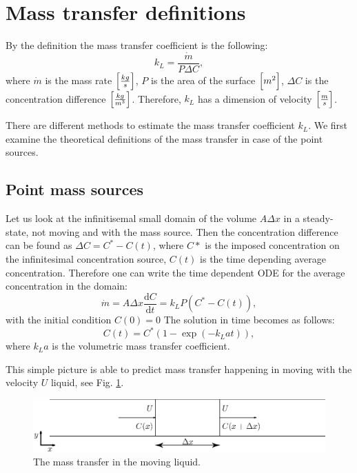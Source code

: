 \documentclass{article}
\newcommand{\beq}{\begin{equation}}
\newcommand{\feq}{\end{equation}}
\begin{document}
\section{Mass transfer definitions}
By the definition the mass transfer coefficient is the following:
\beq
k_L=\frac{\dot{m}}{P \Delta C},
\feq
where $\dot{m}$ is the mass rate $\Bigl[\frac{kg}{s}\Bigr]$, $P$ is the area of the surface
$\Bigl[m^2\Bigr]$, $\Delta C$ is the concentration difference $\Bigl[\frac{kg}{m^3}\Bigr]$.
Therefore, $k_L$ has a dimension of velocity $\Bigl[\frac{m}{s}\Bigr]$. 

There are different methods to estimate the mass transfer coefficient $k_L$. We first examine the
theoretical definitions of the mass transfer in case of the point sources.
\subsection{Point mass sources}
Let us look at the infinitisemal small domain of the volume $A \Delta x$ in a steady-state, not
moving and with the mass source. Then the concentration difference can be found as $\Delta C = C^* -
C(t)$, where $C*$ is the imposed concentration on the infinitesimal concentration source, $C(t)$ is
the time depending average concentration. Therefore one can write the time dependent ODE for the
average concentration in the domain:
\beq
\dot{m}= A \Delta x \frac{\mathrm{d}C}{\mathrm{d} t} = k_L P (C^{*}-C(t)), 
\feq
with the initial condition $C(0)=0$
The solution in time becomes as follows:
\beq
C(t)= C^{*}(1-\exp(-k_L a t )), 
\feq
where $k_L a$ is the volumetric mass transfer coefficient.

This simple picture is able to predict mass transfer happening in moving with the velocity $U$
liquid, see Fig. \ref{fig:moving:frame}.
\begin{figure}[htb!]
\includegraphics[width=\textwidth]{Figures/mass_transfer.eps}
\caption{The mass transfer in the moving liquid. \label{fig:moving:frame}}
\end{figure}
\end{document}
